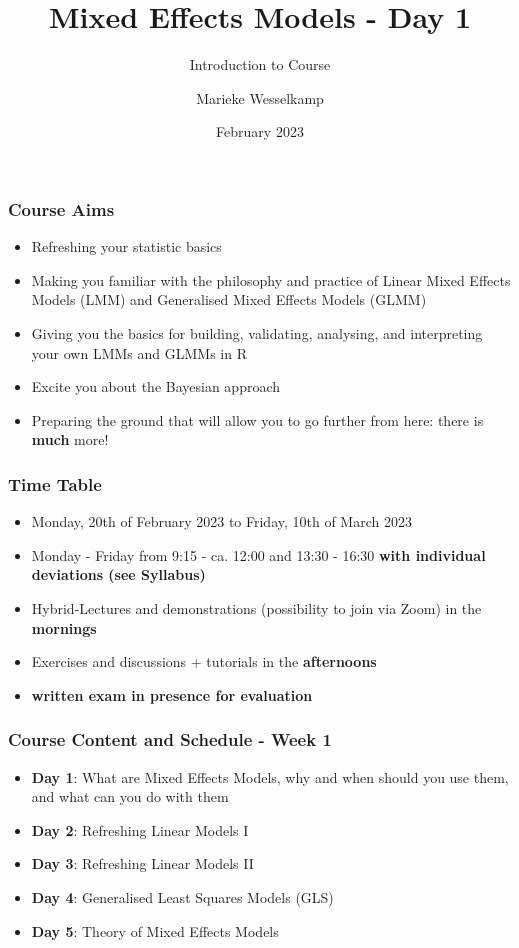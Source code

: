 \documentclass{beamer}
\title{Mixed Effects Models - Day 1}
\subtitle{Introduction to Course}
\author{Marieke Wesselkamp}
\institute{Department of Biometry and Environmental Systems Analysis \\
Albert-Ludwigs-University of Freiburg (Germany)}
\date{February 2023}
\begin{document}
\frame{\titlepage}

\begin{frame}
\frametitle{Course Aims}
\begin{itemize}
    \item Refreshing your statistic basics
    \item Making you familiar with the philosophy and practice of Linear Mixed Effects Models (LMM) and Generalised Mixed Effects Models (GLMM)
    \item Giving you the basics for building, validating, analysing, and interpreting your own LMMs and GLMMs in R
    \item Excite you about the Bayesian approach
    \item Preparing the ground that will allow you to go further from here: there is \textbf{much} more!
\end{itemize}
\end{frame}

\begin{frame}
\frametitle{Time Table}
\begin{itemize}
    \item Monday, 20th of February 2023 to Friday, 10th of March 2023
    \item Monday - Friday from 9:15 - ca. 12:00 and 13:30 - 16:30 \textbf{with individual deviations (see Syllabus)}
    \item Hybrid-Lectures and demonstrations (possibility to join via Zoom) in the \textbf{mornings}
    \item Exercises and discussions + tutorials in the \textbf{afternoons}
    \item \textbf{written exam in presence for evaluation}
\end{itemize}
\end{frame}

\begin{frame}
\frametitle{Course Content and Schedule - Week 1}
\begin{itemize}
    \item \textbf{Day 1}: What are Mixed Effects Models, why and when should you use them, and what can you do with them
    \item \textbf{Day 2}: Refreshing Linear Models I
    \item \textbf{Day 3}: Refreshing Linear Models II
    \item \textbf{Day 4}: Generalised Least Squares Models (GLS)
    \item \textbf{Day 5}: Theory of Mixed Effects Models
\end{itemize}
\end{frame}
\end{document}
